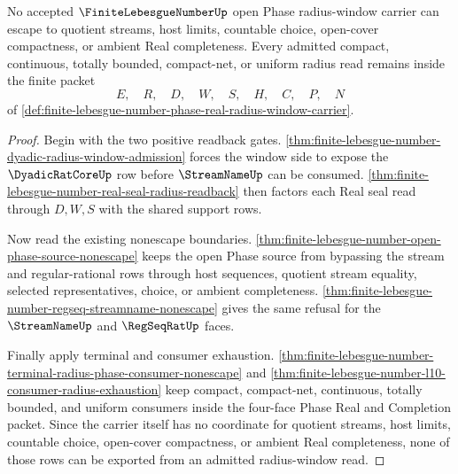 \begin{theorem}
\label{thm:finite-lebesgue-number-open-phase-nonescape}
No accepted $\FiniteLebesgueNumberUp$ open Phase radius-window carrier can escape to quotient streams, host limits, countable choice, open-cover compactness, or ambient Real completeness. Every admitted compact, continuous, totally bounded, compact-net, or uniform radius read remains inside the finite packet
$$
E,\quad R,\quad D,\quad W,\quad S,\quad H,\quad C,\quad P,\quad N
$$
of \autoref{def:finite-lebesgue-number-phase-real-radius-window-carrier}.
\end{theorem}
\begin{proof}
Begin with the two positive readback gates. \autoref{thm:finite-lebesgue-number-dyadic-radius-window-admission} forces the window side to expose the $\DyadicRatCoreUp$ row before $\StreamNameUp$ can be consumed. \autoref{thm:finite-lebesgue-number-real-seal-radius-readback} then factors each Real seal read through $D,W,S$ with the shared support rows.

Now read the existing nonescape boundaries. \autoref{thm:finite-lebesgue-number-open-phase-source-nonescape} keeps the open Phase source from bypassing the stream and regular-rational rows through host sequences, quotient stream equality, selected representatives, choice, or ambient completeness. \autoref{thm:finite-lebesgue-number-regseq-streamname-nonescape} gives the same refusal for the $\StreamNameUp$ and $\RegSeqRatUp$ faces.

Finally apply terminal and consumer exhaustion. \autoref{thm:finite-lebesgue-number-terminal-radius-phase-consumer-nonescape} and \autoref{thm:finite-lebesgue-number-l10-consumer-radius-exhaustion} keep compact, compact-net, continuous, totally bounded, and uniform consumers inside the four-face Phase Real and Completion packet. Since the carrier itself has no coordinate for quotient streams, host limits, countable choice, open-cover compactness, or ambient Real completeness, none of those rows can be exported from an admitted radius-window read.
\end{proof}

